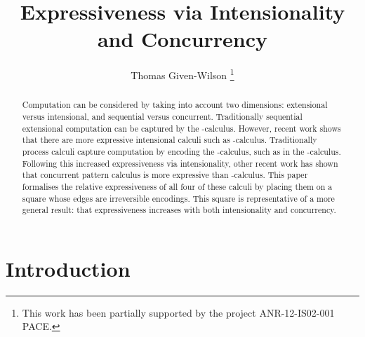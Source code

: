 \documentclass{llncs}
\title{Expressiveness via Intensionality and Concurrency}
\author{Thomas Given-Wilson
\thanks{This work has been partially supported by the project ANR-12-IS02-001 PACE.}}
\institute{INRIA, Paris, France\\
\email{thomas.given-wilson@inria.fr}}
\begin{document}
\makeatactive

\makeatletter
\def \rightarrowfill{\m@th\mathord{\smash-}\mkern-6mu\cleaders\hbox{}\hfill
  \mkern-6mu\mathord\to}
\makeatother
\makeatletter
\def \Rightarrowfill{\m@th\mathord{\smash=}\mkern-6mu\cleaders\hbox{}\hfill
  \mkern-6mu\mathord\Rightarrow}
\makeatother
\def \overstackrel#1#2{\mathrel{\mathop{#1}\limits^{#2}}}

\maketitle  

\vspace{-0.4cm}

\begin{abstract}
Computation can be considered by taking into account two dimensions:
extensional versus intensional,
and sequential versus concurrent.
Traditionally sequential extensional computation can be captured by
the -calculus. However, recent work shows that there are more
expressive intensional calculi such as -calculus.
Traditionally process calculi capture computation by encoding the 
-calculus, such as in the -calculus.
Following this increased expressiveness via intensionality, other
recent work has shown that concurrent pattern calculus is more
expressive than -calculus.
This paper formalises the relative expressiveness of all four of these
calculi by placing them on a square whose edges are irreversible
encodings.
This square is representative of a more general result:
that expressiveness increases with both intensionality and concurrency.
\end{abstract} 


\section{Introduction}
\label{sec:intro}

\vspace{-0.1cm}
\end{document}
